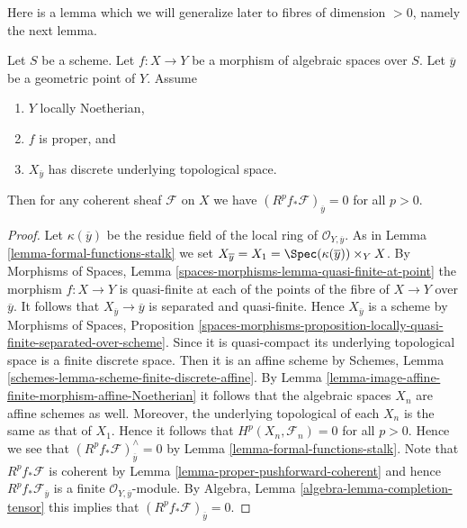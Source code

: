 \noindent
Here is a lemma which we will generalize later to fibres of
dimension $ > 0$, namely the next lemma.

\begin{lemma}
\label{lemma-higher-direct-images-zero-finite-fibre}
Let $S$ be a scheme. Let $f : X \to Y$ be a morphism of algebraic spaces
over $S$. Let $\overline{y}$ be a geometric point of $Y$.
Assume
\begin{enumerate}
\item $Y$ locally Noetherian,
\item $f$ is proper, and
\item $X_{\overline{y}}$ has discrete underlying topological space.
\end{enumerate}
Then for any coherent sheaf $\mathcal{F}$ on $X$ we have
$(R^pf_*\mathcal{F})_{\overline{y}} = 0$ for all $p > 0$.
\end{lemma}

\begin{proof}
Let $\kappa(\overline{y})$ be the residue field of the local
ring of $\mathcal{O}_{Y, \overline{y}}$. As in
Lemma \ref{lemma-formal-functions-stalk}
we set $X_{\overline{y}} = X_1 = \Spec(\kappa(\overline{y})) \times_Y X$.
By Morphisms of Spaces, Lemma
\ref{spaces-morphisms-lemma-quasi-finite-at-point}
the morphism $f : X \to Y$ is quasi-finite at each of
the points of the fibre of $X \to Y$ over $\overline{y}$.
It follows that $X_{\overline{y}} \to \overline{y}$ is separated and
quasi-finite. Hence $X_{\overline{y}}$ is a scheme
by Morphisms of Spaces, Proposition
\ref{spaces-morphisms-proposition-locally-quasi-finite-separated-over-scheme}.
Since it is quasi-compact its underlying topological space is a finite
discrete space. Then it is an affine scheme by
Schemes, Lemma \ref{schemes-lemma-scheme-finite-discrete-affine}.
By Lemma \ref{lemma-image-affine-finite-morphism-affine-Noetherian}
it follows that the algebraic spaces $X_n$ are affine schemes as well.
Moreover, the underlying topological of each $X_n$ is the same
as that of $X_1$. Hence it follows that $H^p(X_n, \mathcal{F}_n) = 0$
for all $p > 0$. Hence we see that
$(R^pf_*\mathcal{F})_{\overline{y}}^\wedge = 0$
by Lemma \ref{lemma-formal-functions-stalk}.
Note that $R^pf_*\mathcal{F}$ is coherent by
Lemma \ref{lemma-proper-pushforward-coherent} and
hence $R^pf_*\mathcal{F}_{\overline{y}}$ is a finite
$\mathcal{O}_{Y, \overline{y}}$-module.
By Algebra, Lemma \ref{algebra-lemma-completion-tensor}
this implies that $(R^pf_*\mathcal{F})_{\overline{y}} = 0$.
\end{proof}

